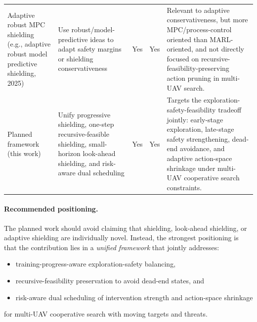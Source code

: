 \documentclass[11pt]{article}
\begin{document}
\begin{table}[htbp]
\begin{tabularx}{\textwidth}{>{\raggedright\arraybackslash}p{3.0cm} >{\raggedright\arraybackslash}p{3.1cm} >{\raggedright\arraybackslash}p{2.2cm} >{\raggedright\arraybackslash}p{2.2cm} >{\raggedright\arraybackslash}X}
Adaptive robust MPC shielding \newline (e.g., adaptive robust model predictive shielding, 2025) & Use robust/model-predictive ideas to adapt safety margins or shielding conservativeness & Yes & Yes & Relevant to adaptive conservativeness, but more MPC/process-control oriented than MARL-oriented, and not directly focused on recursive-feasibility-preserving action pruning in multi-UAV search. \\

Planned framework \newline (this work) & Unify progressive shielding, one-step recursive-feasible shielding, small-horizon look-ahead shielding, and risk-aware dual scheduling & Yes & Yes & Targets the exploration-safety-feasibility tradeoff jointly: early-stage exploration, late-stage safety strengthening, dead-end avoidance, and adaptive action-space shrinkage under multi-UAV cooperative search constraints. \\
\bottomrule
\end{tabularx}
\end{table}

\paragraph{Recommended positioning.}
The planned work should avoid claiming that shielding, look-ahead shielding, or adaptive shielding are individually novel. Instead, the strongest positioning is that the contribution lies in a \emph{unified framework} that jointly addresses:
\begin{itemize}[leftmargin=1.5em]
    \item training-progress-aware exploration-safety balancing,
    \item recursive-feasibility preservation to avoid dead-end states, and
    \item risk-aware dual scheduling of intervention strength and action-space shrinkage
\end{itemize}
for multi-UAV cooperative search with moving targets and threats.
\end{document}
